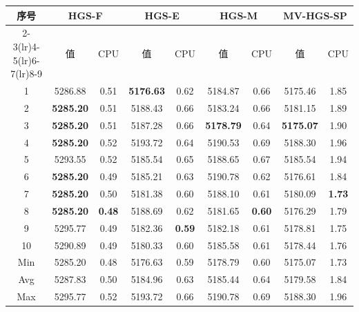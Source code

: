 \begin{tabular*}{\linewidth}{@{\extracolsep{\fill}}ccccccccc@{}}
\toprule
\multirow{2}{*}{序号} & \multicolumn{2}{c}{HGS-F} & \multicolumn{2}{c}{HGS-E} & \multicolumn{2}{c}{HGS-M} & \multicolumn{2}{c}{MV-HGS-SP}\\
\cmidrule(lr){2-3}\cmidrule(lr){4-5}\cmidrule(lr){6-7}\cmidrule(lr){8-9}
 & \multicolumn{1}{c}{值} & \multicolumn{1}{c}{CPU} & \multicolumn{1}{c}{值} & \multicolumn{1}{c}{CPU} & \multicolumn{1}{c}{值} & \multicolumn{1}{c}{CPU} & \multicolumn{1}{c}{值} & \multicolumn{1}{c}{CPU}\\
\midrule
1 & 5286.88 & 0.51 & \textbf{5176.63} & 0.62 & 5184.87 & 0.66 & 5175.46 & 1.85\\
2 & \textbf{5285.20} & 0.51 & 5188.43 & 0.66 & 5183.24 & 0.66 & 5181.15 & 1.89\\
3 & \textbf{5285.20} & 0.51 & 5187.28 & 0.66 & \textbf{5178.79} & 0.64 & \textbf{5175.07} & 1.90\\
4 & \textbf{5285.20} & 0.52 & 5193.72 & 0.64 & 5190.53 & 0.69 & 5188.30 & 1.96\\
5 & 5293.55 & 0.52 & 5185.54 & 0.65 & 5188.65 & 0.67 & 5185.54 & 1.94\\
6 & \textbf{5285.20} & 0.49 & 5185.21 & 0.63 & 5190.78 & 0.62 & 5176.61 & 1.84\\
7 & \textbf{5285.20} & 0.50 & 5181.38 & 0.60 & 5188.10 & 0.61 & 5180.09 & \textbf{1.73}\\
8 & \textbf{5285.20} & \textbf{0.48} & 5188.69 & 0.62 & 5181.65 & \textbf{0.60} & 5176.29 & 1.79\\
9 & 5295.77 & 0.49 & 5182.36 & \textbf{0.59} & 5182.18 & 0.61 & 5178.81 & 1.75\\
10 & 5290.89 & 0.49 & 5180.33 & 0.60 & 5185.58 & 0.61 & 5178.44 & 1.76\\
Min & 5285.20 & 0.48 & 5176.63 & 0.59 & 5178.79 & 0.60 & 5175.07 & 1.73\\
Avg & 5287.83 & 0.50 & 5184.96 & 0.63 & 5185.44 & 0.64 & 5179.58 & 1.84\\
Max & 5295.77 & 0.52 & 5193.72 & 0.66 & 5190.78 & 0.69 & 5188.30 & 1.96\\
\bottomrule
\end{tabular*}
